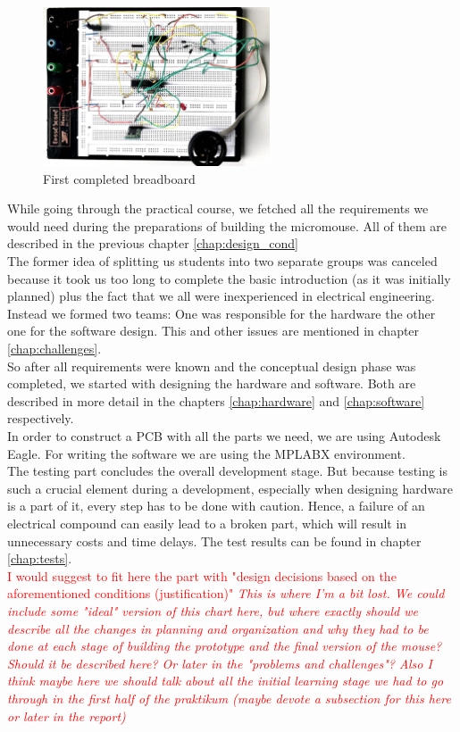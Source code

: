 \begin{figure}[H]
    \centering
    \includegraphics[width=0.6\textwidth]{figures/breadboard.jpeg}
    \caption{First completed breadboard}
    \label{fig:breadboard}
\end{figure}

\noindent
While going through the practical course, we fetched all the requirements we would need during the preparations of building the micromouse. All of them are described in the previous chapter \ref{chap:design_cond} \\

\noindent
The former idea of splitting us students into two separate groups was canceled because it took us too long to complete the basic introduction (as it was initially planned) plus the fact that we all were inexperienced in electrical engineering. Instead we formed two teams: One was responsible for the hardware the other one for the software design. This and other issues are mentioned in chapter \ref{chap:challenges}.\\
So after all requirements were known and the conceptual design phase was completed, we started with designing the hardware and software. Both are described in more detail in the chapters \ref{chap:hardware} and \ref{chap:software} respectively. \\
In order to construct a PCB with all the parts we need, we are using Autodesk Eagle. For writing the software we are using the MPLABX environment. \\

\noindent
The testing part concludes the overall development stage. But because testing is such a crucial element during a development, especially when designing hardware is a part of it, every step has to be done with caution. Hence, a failure of an electrical compound can easily lead to a broken part, which will result in unnecessary costs and time delays. The test results can be found in chapter \ref{chap:tests}. \\

\textcolor{red}{I would suggest to fit here the part with "design decisions based on the aforementioned conditions (justification)"
\textit{ This is where I'm a bit lost. We could include some "ideal" version of this chart here, but where exactly should we describe all the changes in planning and organization and why they had to be done at each stage of building the prototype and the final version of the mouse?  Should it be described here? Or later in the "problems and challenges"?
Also I think maybe here we should talk about all the initial learning stage we had to go through in the first half of the praktikum (maybe devote a subsection for this here or later in the report)}}

